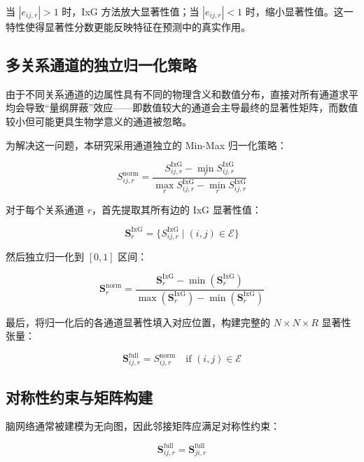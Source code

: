 当 $|e_{ij,r}| > 1$ 时，IxG 方法放大显著性值；当 $|e_{ij,r}| < 1$ 时，缩小显著性值。这一特性使得显著性分数更能反映特征在预测中的真实作用。

\subsection{多关系通道的独立归一化策略}

由于不同关系通道的边属性具有不同的物理含义和数值分布，直接对所有通道求平均会导致``量纲屏蔽''效应——即数值较大的通道会主导最终的显著性矩阵，而数值较小但可能更具生物学意义的通道被忽略。

为解决这一问题，本研究采用通道独立的 Min-Max 归一化策略：

\begin{equation}
S_{ij,r}^{\text{norm}} = \frac{S_{ij,r}^{\text{IxG}} - \min_r S_{ij,r}^{\text{IxG}}}{\max_r S_{ij,r}^{\text{IxG}} - \min_r S_{ij,r}^{\text{IxG}}}
\end{equation}

对于每个关系通道 $r$，首先提取其所有边的 IxG 显著性值：

\begin{equation}
\mathbf{S}_r^{\text{IxG}} = \{ S_{ij,r}^{\text{IxG}} \mid (i,j) \in \mathcal{E} \}
\end{equation}

然后独立归一化到 $[0, 1]$ 区间：

\begin{equation}
\mathbf{S}_r^{\text{norm}} = \frac{\mathbf{S}_r^{\text{IxG}} - \min(\mathbf{S}_r^{\text{IxG}})}{\max(\mathbf{S}_r^{\text{IxG}}) - \min(\mathbf{S}_r^{\text{IxG}})}
\end{equation}

最后，将归一化后的各通道显著性填入对应位置，构建完整的 $N \times N \times R$ 显著性张量：

\begin{equation}
\mathbf{S}^{\text{full}}_{ij,r} = S_{ij,r}^{\text{norm}} \quad \text{if } (i,j) \in \mathcal{E}
\end{equation}

\subsection{对称性约束与矩阵构建}

脑网络通常被建模为无向图，因此邻接矩阵应满足对称性约束：

\begin{equation}
\mathbf{S}^{\text{full}}_{ij,r} = \mathbf{S}^{\text{full}}_{ji,r}
\end{equation}

